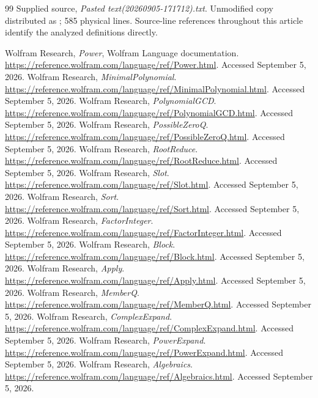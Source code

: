 \documentclass[11pt,letterpaper]{article}
\newcommand{\code}[1]{\texttt{\detokenize{#1}}}
\theoremstyle{definition}
\begin{document}
\clearpage
\begin{thebibliography}{99}
 Supplied source, \emph{Pasted text(20260905-171712).txt}.
Unmodified copy distributed as \code{source.wl}; 585 physical lines. Source-line
references throughout this article identify the analyzed definitions directly.

 Wolfram Research, \emph{Power}, Wolfram Language documentation.
\url{https://reference.wolfram.com/language/ref/Power.html}.
Accessed September 5, 2026.
 Wolfram Research, \emph{MinimalPolynomial}.
\url{https://reference.wolfram.com/language/ref/MinimalPolynomial.html}.
Accessed September 5, 2026.
 Wolfram Research, \emph{PolynomialGCD}.
\url{https://reference.wolfram.com/language/ref/PolynomialGCD.html}.
Accessed September 5, 2026.
 Wolfram Research, \emph{PossibleZeroQ}.
\url{https://reference.wolfram.com/language/ref/PossibleZeroQ.html}.
Accessed September 5, 2026.
 Wolfram Research, \emph{RootReduce}.
\url{https://reference.wolfram.com/language/ref/RootReduce.html}.
Accessed September 5, 2026.
 Wolfram Research, \emph{Slot}.
\url{https://reference.wolfram.com/language/ref/Slot.html}.
Accessed September 5, 2026.
 Wolfram Research, \emph{Sort}.
\url{https://reference.wolfram.com/language/ref/Sort.html}.
Accessed September 5, 2026.
 Wolfram Research, \emph{FactorInteger}.
\url{https://reference.wolfram.com/language/ref/FactorInteger.html}.
Accessed September 5, 2026.
 Wolfram Research, \emph{Block}.
\url{https://reference.wolfram.com/language/ref/Block.html}.
Accessed September 5, 2026.
 Wolfram Research, \emph{Apply}.
\url{https://reference.wolfram.com/language/ref/Apply.html}.
Accessed September 5, 2026.
 Wolfram Research, \emph{MemberQ}.
\url{https://reference.wolfram.com/language/ref/MemberQ.html}.
Accessed September 5, 2026.
 Wolfram Research, \emph{ComplexExpand}.
\url{https://reference.wolfram.com/language/ref/ComplexExpand.html}.
Accessed September 5, 2026.
 Wolfram Research, \emph{PowerExpand}.
\url{https://reference.wolfram.com/language/ref/PowerExpand.html}.
Accessed September 5, 2026.
 Wolfram Research, \emph{Algebraics}.
\url{https://reference.wolfram.com/language/ref/Algebraics.html}.
Accessed September 5, 2026.
\end{thebibliography}
\end{document}
